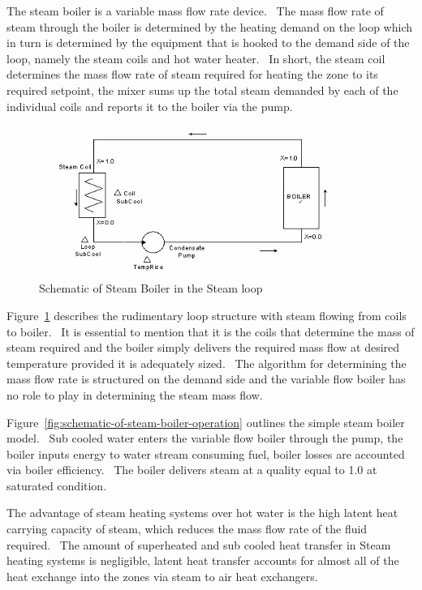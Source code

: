 The steam boiler is a variable mass flow rate device.~ The mass flow rate of steam through the boiler is determined by the heating demand on the loop which in turn is determined by the equipment that is hooked to the demand side of the loop, namely the steam coils and hot water heater.~ In short, the steam coil determines the mass flow rate of steam required for heating the zone to its required setpoint, the mixer sums up the total steam demanded by each of the individual coils and reports it to the boiler via the pump.

\begin{figure}[hbtp] %
\centering
\includegraphics[width=0.9\textwidth, height=0.9\textheight, keepaspectratio=true]{media/image2932.png}
\caption{Schematic of Steam Boiler in the Steam loop \protect \label{fig:schematic-of-steam-boiler-in-the-steam-loop}}
\end{figure}

Figure~\ref{fig:schematic-of-steam-boiler-in-the-steam-loop} describes the rudimentary loop structure with steam flowing from coils to boiler.~ It is essential to mention that it is the coils that determine the mass of steam required and the boiler simply delivers the required mass flow at desired temperature provided it is adequately sized.~ The algorithm for determining the mass flow rate is structured on the demand side and the variable flow boiler has no role to play in determining the steam mass flow.

Figure~\ref{fig:schematic-of-steam-boiler-operation} outlines the simple steam boiler model.~ Sub cooled water enters the variable flow boiler through the pump, the boiler inputs energy to water stream consuming fuel, boiler losses are accounted via boiler efficiency.~ The boiler delivers steam at a quality equal to 1.0 at saturated condition.

The advantage of steam heating systems over hot water is the high latent heat carrying capacity of steam, which reduces the mass flow rate of the fluid required.~ The amount of superheated and sub cooled heat transfer in Steam heating systems is negligible, latent heat transfer accounts for almost all of the heat exchange into the zones via steam to air heat exchangers.

